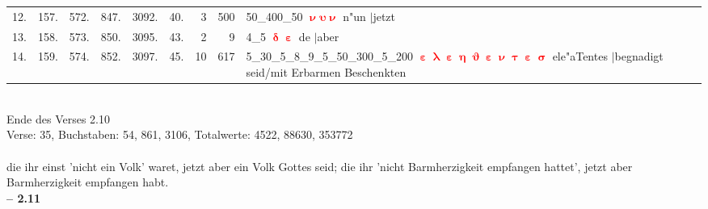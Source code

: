 \documentclass[a4paper,10pt,landscape]{article}
\begin{document}
\begin{tabular}{rrrrrrrrp{120mm}}
12.&157.&572.&847.&3092.&40.&3&500&50\_400\_50 \textcolor{red}{$\boldsymbol{\upnu\upsilon\upnu}$} n"un $|$jetzt\\
13.&158.&573.&850.&3095.&43.&2&9&4\_5 \textcolor{red}{$\boldsymbol{\updelta\upepsilon}$} de $|$aber\\
14.&159.&574.&852.&3097.&45.&10&617&5\_30\_5\_8\_9\_5\_50\_300\_5\_200 \textcolor{red}{$\boldsymbol{\upepsilon\uplambda\upepsilon\upeta\upvartheta\upepsilon\upnu\uptau\upepsilon\upsigma}$} ele"aTentes $|$begnadigt seid/mit Erbarmen Beschenkten\\
\end{tabular}\medskip \\
Ende des Verses 2.10\\
Verse: 35, Buchstaben: 54, 861, 3106, Totalwerte: 4522, 88630, 353772\\
\\
die ihr einst 'nicht ein Volk' waret, jetzt aber ein Volk Gottes seid; die ihr 'nicht Barmherzigkeit empfangen hattet', jetzt aber Barmherzigkeit empfangen habt.\\
\newpage 
{\bf -- 2.11}\\
\medskip \\
\end{document}
